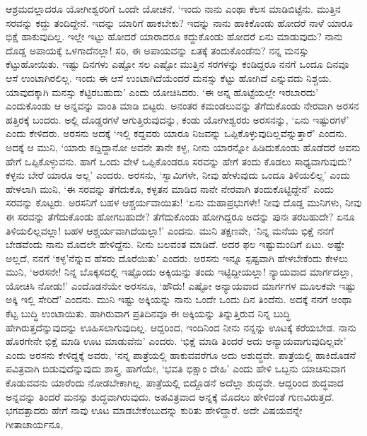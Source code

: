 ಆಶ್ರಮದಲ್ಲಾದರೂ ಯೋಗೀಶ್ವರರಿಗೆ ಒಂದೇ ಯೋಚನೆ. `ಇಂದು ನಾನು ಎಂಥಾ ಕೆಲಸ ಮಾಡಿಬಿಟ್ಟೆನು. ಮುತ್ತಿನ ಸರವನ್ನು ಕದ್ದು ತಂದಿದ್ದೇನೆ. ಇದನ್ನು ಯಾರಿಗೆ ಹಾಕಬೇಕು? ಇದನ್ನು ನಾನು ಹಾಕಿಕೊಂಡು ಹೋದರೆ ನಾಳೆ ಯಾರೂ ಭಿಕ್ಷೆ ಹಾಕುವುದಿಲ್ಲ. ಇಲ್ಲೇ ಇಟ್ಟು ಹೋದರೆ ಯಾರಾದರೂ ಕದ್ದುಕೊಂಡು ಹೋದರೆ ಏನು ಮಾಡುವುದು? ನಾನು ದೊಡ್ಡ ಅಪಾಯಕ್ಕೆ ಒಳಗಾದೆನಲ್ಲಾ! ಸರಿ, ಈ ಅಪಾಯವನ್ನು ಏತಕ್ಕೆ ತಂದುಕೊಂಡೆನು? ನನ್ನ ಮನಸ್ಸು ಕೆಟ್ಟುಹೋಯಿತು. ಇಷ್ಟು ದಿನಗಳು ಎಷ್ಟೋ ಸಲ ಎಷ್ಟೋ ಮುತ್ತಿನ ಸರಗಳನ್ನು ಕಂಡಿದ್ದರೂ ನನಗೆ ಒಂದೂ ದಿನವೂ ಆಸೆ ಉಂಟಾಗಿರಲಿಲ್ಲ. ಇಂದು ಈ ಆಸೆ ಉಂಟಾಗಿದೆಯೆಂದರೆ ಮನಸ್ಸು ಕೆಟ್ಟು ಹೋಗಿದೆ ಎನ್ನುವದು ನಿಶ್ಚಯ. ಯಾವುದಕ್ಕಾಗಿ ಮನಸ್ಸು ಕೆಟ್ಟಿರಬಹುದು' ಎಂದು ಯೋಚಿಸಿದರು. `ಈ ಅನ್ನ ಹೊಟ್ಟೆಯಲ್ಲೇ ಇರಬಾರದು' ಎಂದುಕೊಂಡು ಆ ಅನ್ನವನ್ನು ವಾಂತಿ ಮಾಡಿ ಬಿಟ್ಟರು. ಅನಂತರ ಕಮಂಡಲುವನ್ನು ತೆಗೆದುಕೊಂಡು ನೇರವಾಗಿ ಅರಸನ ಹತ್ತಿರಕ್ಕೆ ಬಂದರು. ಅಲ್ಲಿ ದೊಡ್ಡರಗಳೆ ಆಗುತ್ತಿರುವುದನ್ನು, ಕಂಡು ಯೋಗೀಶ್ವರರು ಅರಸನನ್ನು, `ಏನು ಇಷ್ಟುರಗಳೆ' ಎಂದು ಕೇಳಿದರು. ಅರಸನು ಅದಕ್ಕೆ `ಇಲ್ಲಿ ಕದ್ದವರು ಯಾರೂ ನಿಜವನ್ನು ಒಪ್ಪಿಕೊಳ್ಳುವುದಿಲ್ಲವೆನ್ನುತ್ತಾರೆ' ಎಂದನು. ಅದಕ್ಕೆ ಆ ಮುನಿ, `ಯಾರು ಕದ್ದಿದ್ದಾನೋ ಅವನೇ ತಾನೇ ಕಳ್ಳ, ನೀನು ಯಾರನ್ನೋ ಹಿಡಿದುಕೊಂಡು ಹೊಡೆದರೆ ಅವನು ಹೇಗೆ ಒಪ್ಪಿಕೊಳ್ಳುವನು. ಹಾಗೆ ಒಂದು ವೇಳೆ ಒಪ್ಪಿಕೊಂಡರೂ ಸರವನ್ನು ಹೇಗೆ ತಂದು ಕೊಡಲು ಸಾಧ್ಯವಾಗುವುದು? ಕಳ್ಳನು ಬೇರೆ ಯಾರೂ ಅಲ್ಲ' ಎಂದರು. ಅರಸನು, `ಸ್ವಾಮಿಗಳೇ, ನೀವು ಹೇಳುವುದು ಒಂದೂ ತಿಳಿಯಲಿಲ್ಲ' ಎಂದು ಹೇಳಲಾಗಿ ಮುನಿ, `ಈ ಸರವನ್ನು ತೆಗೆದುಕೊ, ಕಳ್ಳತನ ಮಾಡಿದ ನಾನೇ ನೇರವಾಗಿ ತಂದುಕೊಟ್ಟಿದ್ದೇನೆ' ಎಂದು ಸರವನ್ನು ಕೊಟ್ಟರು. ಅರಸನಿಗೆ ಬಹಳ ಆಶ್ಚರ್ಯವಾಯಿತು! `ಏನು ಮಹಾಪ್ರಭುಗಳೇ! ನೀವು ದೊಡ್ಡ ಮುನಿಗಳು, ನೀವು ಈ ಸರವನ್ನು ತೆಗೆದುಕೊಂಡು ಹೋಗಬಹುದೇ? ತೆಗೆದುಕೊಂಡು ಹೋಗಿದ್ದರೂ ಅದನ್ನು ಪುನಃ ತರಬಹುದೇ? ಏನೂ ತಿಳಿಯಲಿಲ್ಲವಲ್ಲಾ! ಬಹಳ ಆಶ್ಚರ್ಯವಾಗಿದೆಯಲ್ಲಾ!' ಎಂದನು. ಮುನಿ ತಕ್ಷಣವೇ, `ನಿನ್ನ ಮನೆಯ ಭಿಕ್ಷೆ ನನಗೆ ಬೇಡವೆಂದು ನಾನು ಮೊದಲೇ ಹೇಳಿದ್ದೆನು. ನೀನು ಬಲವಂತ ಮಾಡಿದೆ. ಅದರ ಫಲ ಇಷ್ಟುಮಂದಿಗೆ ಏಟು. ಅಷ್ಟೇ ಅಲ್ಲದೆ, ನನಗೆ `ಕಳ್ಳ'ನೆನ್ನುವ ಹೆಸರು ದೊರೆಯಿತು' ಎಂದರು. ಅರಸನು ಇನ್ನೂ ಸ್ಪಷ್ಟವಾಗಿ ಹೇಳಬೇಕೆಂದು ಕೇಳಲು ಮುನಿ, `ಅರಸನೇ! ನಿನ್ನ ಬೊಕ್ಕಸದಲ್ಲಿ ಇಷ್ಟೊಂದು ಅಕ್ಕಿಯನ್ನು ತಂದು ಇಟ್ಟಿದ್ದೀಯಲ್ಲಾ! ನ್ಯಾಯವಾದ ಮಾರ್ಗದಲ್ಲಾ, ಯೋಚಿಸಿ ನೋಡು!' ಎಂದೊಡನೆಯೇ ಅರಸನೂ, `ಹೌದು! ಎಷ್ಟೋ ಅನ್ಯಾಯವಾದ ಮಾರ್ಗಗಳ ಮೂಲಕವೇ ಇಷ್ಟು ಅಕ್ಕಿ ಇಲ್ಲಿ ಸೇರಿದೆ' ಎಂದನು. ಮುನಿ ಇಷ್ಟು ಅಕ್ಕಿಯನ್ನು ನಾನು ಒಂದೇ ಒಂದು ದಿನ ತಿಂದೆನು. ಅದಕ್ಕೆ ನನಗೆ ಅಂಥಾ ಕೆಟ್ಟ ಬುದ್ಧಿ ಉಂಟಾಯಿತು. ಹಾಗಿರುವಾಗ ಪ್ರತಿದಿನವೂ ಈ ಅಕ್ಕಿಯನ್ನು ತಿನ್ನುತ್ತಿರುವ ನಿನ್ನ ಬುದ್ಧಿ ಹೇಗಿರುತ್ತದೆನ್ನುವುದನ್ನು ಊಹಿಸಲಾಗುವುದಿಲ್ಲ. ಆದ್ದರಿಂದ, ಇಂದಿನಿಂದ ನೀನು ನನ್ನನ್ನು ಊಟಕ್ಕೆ ಕರೆಯಬೇಡ. ನಾನು ಹೊರಗೇನೇ ಭಿಕ್ಷೆ ಮಾಡಿ ಊಟ ಮಾಡುವೆನು' ಎಂದರು. `ಭಿಕ್ಷೆ ಮಾಡಿ ತಿಂದರೆ ಅದು ಅನ್ಯಾಯವಾಗುವುದಿಲ್ಲವೇ' ಎಂದು ಅರಸನು ಕೇಳಿದ್ದಕ್ಕೆ ಅವರು, `ನನ್ನ ಪಾತ್ರೆಯಲ್ಲಿ ಹಾಕುವವರೆಗೂ ಅದು ಅಶುದ್ಧವೇ. ಪಾತ್ರೆಯಲ್ಲಿ ಹಾಕಿದೊಡನೆ ಪವಿತ್ರವಾಗಿ ಬಿಡುವುದೆನ್ನುವುದು ಶಾಸ್ತ್ರ. ಹಾಗೆಯೇ, `ಭವತಿ ಭಿಕ್ಷಾಂ ದೇಹಿ' ಎಂದು ಹೇಳಿ ಒಬ್ಬನು ಯಾಚಿಸುವಾಗ ಕೊಡುವವನು ಯಾರೆಂದು ನೋಡಬೇಕಾಗಿಲ್ಲ. ಪಾತ್ರೆಯಲ್ಲಿ ಬಿದ್ದೊಡನೆ ಅದೆಲ್ಲಾ ಶುದ್ಧವೇ. ಆದ್ದರಿಂದ ಶುದ್ಧವಾದ ಅನ್ನವನ್ನು ತಿಂದರೆ ಮನಸ್ಸು ಶುದ್ಧವಾಗಿರುವುದು. ಅಪವಿತ್ರವಾದ ಅನ್ನಕ್ಕೆ ಮೊದಲು ಹೇಳಿದಂತೆ ಗುಣವಿರುತ್ತದೆ. ಭಗವತ್ಪಾದರು ಹೇಗೆ ನಾವು ಊಟ ಮಾಡಬೇಕೆಂಬುದನ್ನು ಕುರಿತು ಹೇಳಿದ್ದಾರೆ. ಅದೇ ವಿಷಯವನ್ನೇ ಗೀತಾಚಾರ್ಯನೂ,

